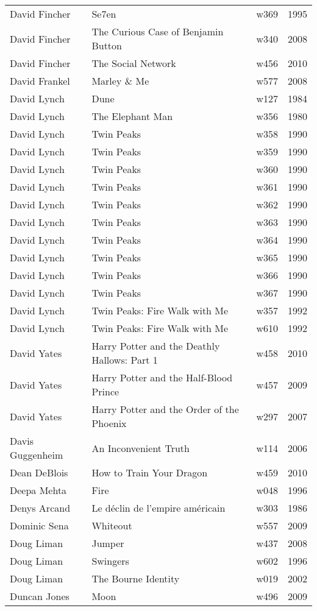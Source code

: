 \documentclass{article}
\begin{document}
\begin {center}
\begin{longtable}{l p{10cm} l l}
David Fincher & Se7en & w369 & 1995 \\
David Fincher & The Curious Case of Benjamin Button & w340 & 2008 \\
David Fincher & The Social Network & w456 & 2010 \\
David Frankel & Marley \& Me & w577 & 2008 \\
David Lynch & Dune & w127 & 1984 \\
David Lynch & The Elephant Man & w356 & 1980 \\
David Lynch & Twin Peaks & w358 & 1990 \\
David Lynch & Twin Peaks & w359 & 1990 \\
David Lynch & Twin Peaks & w360 & 1990 \\
David Lynch & Twin Peaks & w361 & 1990 \\
David Lynch & Twin Peaks & w362 & 1990 \\
David Lynch & Twin Peaks & w363 & 1990 \\
David Lynch & Twin Peaks & w364 & 1990 \\
David Lynch & Twin Peaks & w365 & 1990 \\
David Lynch & Twin Peaks & w366 & 1990 \\
David Lynch & Twin Peaks & w367 & 1990 \\
David Lynch & Twin Peaks: Fire Walk with Me & w357 & 1992 \\
David Lynch & Twin Peaks: Fire Walk with Me & w610 & 1992 \\
David Yates & Harry Potter and the Deathly Hallows: Part 1 & w458 & 2010 \\
David Yates & Harry Potter and the Half-Blood Prince & w457 & 2009 \\
David Yates & Harry Potter and the Order of the Phoenix & w297 & 2007 \\
Davis Guggenheim & An Inconvenient Truth & w114 & 2006 \\
Dean DeBlois & How to Train Your Dragon & w459 & 2010 \\
Deepa Mehta & Fire & w048 & 1996 \\
Denys Arcand & Le déclin de l'empire américain & w303 & 1986 \\
Dominic Sena & Whiteout & w557 & 2009 \\
Doug Liman & Jumper & w437 & 2008 \\
Doug Liman & Swingers & w602 & 1996 \\
Doug Liman & The Bourne Identity & w019 & 2002 \\
Duncan Jones & Moon & w496 & 2009 \\

\end{longtable}
\end{center}
\end{document}
